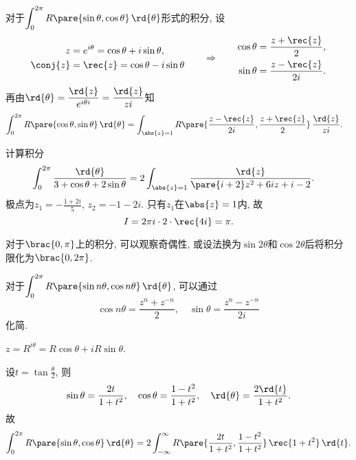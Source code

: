 \documentclass{ctexart}
\begin{document}
对于$\displaystyle \int_0^{2\pi} R\pare{\sin\theta,\cos\theta}\,\rd{\theta}$形式的积分, 设
\[ \begin{aligned}
    z &= e^{i\theta} = \cos\theta + i\sin\theta, \\ 
    \conj{z} &= \rec{z} = \cos\theta - i\sin\theta
\end{aligned} \qquad \Rightarrow \qquad \begin{aligned}
    \cos\theta &= \frac{z+ \rec{z}}{2}, \\
    \sin\theta &= \frac{z - \rec{z}}{2i}.
\end{aligned} \]
再由$\displaystyle \rd{\theta} = \frac{\rd{z}}{e^{i\theta i}} = \frac{\rd{z}}{zi}$知
\begin{align*}
    \int_0^{2\pi} R\pare{\cos\theta,\sin\theta}\,\rd{\theta} &= \int_{\abs{z} = 1} R\pare{\frac{z-\rec{z}}{2i}, \frac{z+\rec{z}}{2}}\,\frac{\rd{z}}{zi}.
\end{align*}
\begin{sample}
    \begin{ex}
        计算积分
        \begin{align*}
            \int_0^{2\pi} \frac{\rd{\theta}}{3 + \cos\theta + 2\sin\theta} &= 2\int_{\abs{z} = 1} \frac{\rd{z}}{\pare{i+2}z^2 + 6iz + i-2}.
        \end{align*}
        极点为$\displaystyle z_1 = -\frac{1+2i}{5}$, $\displaystyle z_2 = -1-2i$. 只有$z_1$在$\abs{z}=1$内, 故
        \[ I = 2\pi i\cdot 2 \cdot \rec{4i} = \pi. \]
    \end{ex}
\end{sample}
\begin{remark}
    对于$\brac{0,\pi}$上的积分, 可以观察奇偶性, 或设法换为$\sin 2\theta$和$\cos 2\theta$后将积分限化为$\brac{0, 2\pi}$.
\end{remark}
\begin{remark}
    对于$\displaystyle \int_0^{2\pi} R\pare{\sin n\theta,\cos n\theta}\,\rd{\theta}$, 可以通过
    \[ \cos n\theta = \frac{z^n + z^{-n}}{2},\quad \sin\theta = \frac{z^n - z^{-n}}{2i} \]
    化简.
\end{remark}
\begin{remark}
    $z = R^{i\theta} = R\cos\theta + iR\sin\theta$.
\end{remark}
\begin{remark}
    设$\displaystyle t = \tan \frac{\theta}{2}$, 则
    \[ \sin\theta = \frac{2t}{1+t^2},\quad \cos\theta = \frac{1-t^2}{1+t^2},\quad \rd{\theta} = \frac{2\rd{t}}{1+t^2}. \]
    故
    \[ \int_0^{2\pi} R\pare{\sin\theta,\cos\theta} \,\rd{\theta} = 2\int_{-\infty}^{\infty} R\pare{\frac{2t}{1+t^2},\frac{1-t^2}{1+t^2}}\,\rec{1+t^2}\,\rd{t}. \]
\end{remark}
\end{document}
